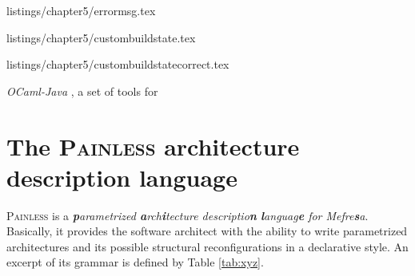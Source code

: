       
                          {listings/chapter5/errormsg.tex}			 				
                          
                          
	\noindent            
           
                          
                          
        
                          {listings/chapter5/custombuildstate.tex}			                   
                          
	 				
		
                          {listings/chapter5/custombuildstatecorrect.tex}			 				
	 				
	 				
					
				\textit{OCaml-Java} \cite{conf/sfp/Clerc12}, a set of tools for
					
								



\section{The \textsc{Painless} architecture description language}
\label{sec:painless}

	\textsc{Painless} is a \textit{\textbf{p}arametrized \textbf{a}rch\textbf{i}tecture 
	descriptio\textbf{n} \textbf{l}anguag\textbf{e} for \textsf{Mefre\textbf{s}a}}. Basically,
	it provides the software architect with the ability to write parametrized architectures
	and its possible structural reconfigurations in a declarative style. An excerpt of
	its grammar is defined by Table \ref{tab:xyz}.

